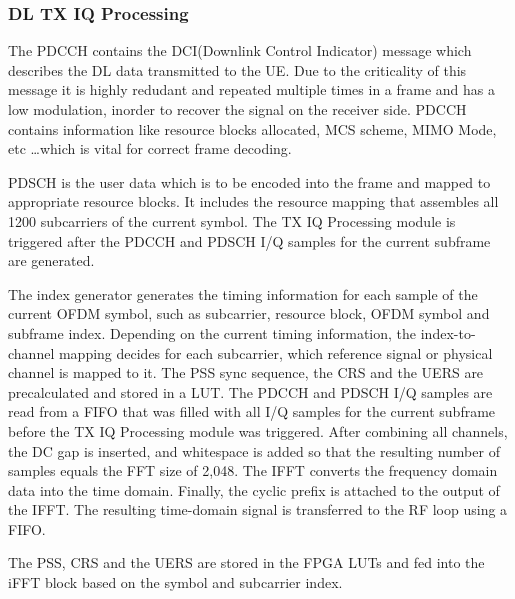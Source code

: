 \subsubsection{DL TX IQ Processing}\label{sssec:DLTXIQProc}

The PDCCH contains the DCI(Downlink Control Indicator) message which describes the DL data transmitted to the UE. Due to the criticality of this message it is highly redudant and repeated multiple times in a frame and has a low modulation, inorder to recover the signal on the receiver side. PDCCH contains information like resource blocks allocated, MCS scheme, MIMO Mode, etc \ldots which is vital for correct frame decoding.

PDSCH is the user data which is to be encoded into the frame and mapped to appropriate resource blocks. It includes the resource mapping that assembles all 1200 subcarriers of the current symbol. The TX IQ Processing module is triggered after the PDCCH and PDSCH I/Q samples for the current subframe are generated.

The index generator generates the timing information for each sample of the current OFDM symbol, such as subcarrier, resource block, OFDM symbol and subframe index. Depending on the current timing information, the index-to-channel mapping decides for each subcarrier, which reference signal or physical channel is mapped to it. The PSS sync sequence, the CRS and the UERS are precalculated and stored in a LUT. The PDCCH and PDSCH I/Q samples are read from a FIFO that was filled with all I/Q samples for the current subframe before the TX IQ Processing module was triggered. After combining all channels, the DC gap is inserted, and whitespace is added so that the resulting number of samples equals the FFT size of 2,048. The IFFT converts the frequency domain data into the time domain. Finally, the cyclic prefix is attached to the output of the IFFT. The resulting time-domain signal is transferred to the RF loop using a FIFO.

The PSS, CRS and the UERS are stored in the FPGA LUTs and fed into the iFFT block based on the symbol and subcarrier index.



